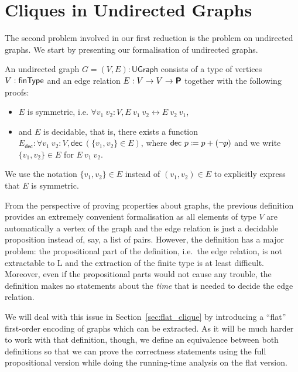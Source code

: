 \newcommand{\UGraph}{\textsf{UGraph}}
\newcommand{\Edec}{\ensuremath{E_\textsf{dec}}}
\section{Cliques in Undirected Graphs}\label{sec:clique}
The second problem involved in our first reduction is the \Clique{} problem on undirected graphs. We start by presenting our formalisation of undirected graphs.

\begin{definition}
  An undirected graph $G = (V, E) : \UGraph$\mnote[UGraph]{\UGraph} consists of a type of vertices $V : \textsf{finType}$ and an edge relation $E : V \rightarrow V \rightarrow \textsf{\bfseries P}$ together with the following proofs:
  \begin{itemize}
    \item $E$ is symmetric, i.e. $\forall v_1~v_2 : V, E~v_1~v_2 \leftrightarrow E~v_2~v_1$, 
    \item and $E$ is decidable, that is, there exists a function $\Edec : \forall v_1~v_2 : V, \textsf{dec}~(\{v_1, v_2\} \in E)$, where $\textsf{dec}~p \coloneqq p + (\lnot p)$ and we write $\{v_1, v_2\} \in E$ for $E~v_1~v_2$.
  \end{itemize}
  We use the notation $\{v_1, v_2\} \in E$ instead of $(v_1, v_2) \in E$ to explicitly express that $E$ is symmetric.
\end{definition}

\begin{remark}\label{rem:ugraph}
  From the perspective of proving properties about graphs, the previous definition provides an extremely convenient formalisation as all elements of type $V$ are automatically a vertex of the graph and the edge relation is just a decidable proposition instead of, say, a list of pairs. 
  However, the definition has a major problem: the propositional part of the definition, i.e.\ the edge relation, is not extractable to L and the extraction of the finite type is at least difficult. Moreover, even if the propositional parts would not cause any trouble, the definition makes no statements about the \emph{time} that is needed to decide the edge relation. 

  We will deal with this issue in Section~\ref{sec:flat_clique} by introducing a ``flat'' first-order encoding of graphs which can be extracted. 
  As it will be much harder to work with that definition, though, we define an equivalence between both definitions so that we can prove the correctness statements using the full propositional version while doing the running-time analysis on the flat version.
\end{remark}

